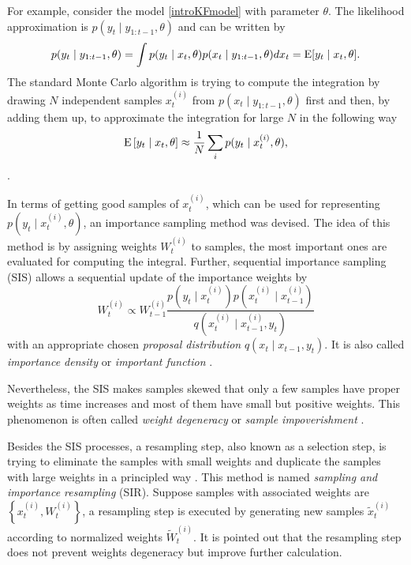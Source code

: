 For example, consider the model \eqref{introKFmodel} with parameter $\theta$. The likelihood approximation is $p(y_t\mid y_{1:t-1},\theta)$ and can be written by
\begin{equation*}
p(y_t\mid y_{1:t-1},\theta) = \int p(y_t\mid x_t,\theta)p(x_t\mid y_{1:t-1},\theta) dx_t = \mathrm{E} \lbrack y_t\mid x_t,\theta \rbrack.
\end{equation*}
The standard Monte Carlo algorithm is trying to compute the integration by drawing $N$ independent samples $x_t^{(i)}$ from $p(x_t\mid y_{1:t-1},\theta)$ first and then, by adding them up, to approximate the integration for large $N$ in the following way 
\begin{equation*}
\mathrm{E}\left[ y_t\mid x_t,\theta \right]\approx \frac{1}{N}\sum_i p(y_t\mid x_t^{(i)},\theta), 
\end{equation*}
\citep{kalos2008monte}.

In terms of getting good samples of $x_t^{(i)}$, which can be used for representing $p(y_t\mid x_t^{(i)},\theta)$, an importance sampling method was devised. The idea of this method is by assigning weights $W_t^{(i)}$ to samples, the most important ones are evaluated for computing the integral. Further, sequential importance sampling (SIS) allows a sequential update of the importance weights by 
\begin{equation*}
W_t^{(i)} \propto W_{t-1}^{(i)} \frac{ p\left(y_t \mid x_t^{(i)}\right) p\left(x_{t}^{(i)}\mid x_{t-1}^{(i)}\right) }{q\left(x_{t}^{(i)}\mid x_{t-1}^{(i)},y_{t}\right)}
\end{equation*}
with an appropriate chosen \textit{proposal distribution} $q(x_{t}\mid  x_{t-1},y_{t})$. It is also called \textit{importance density} or \textit{important function}  \citep{chen2003bayesian}. 


Nevertheless, the SIS makes samples skewed that only a few samples have proper weights as time increases and most of them have small but positive weights. This phenomenon is often called \textit{weight degeneracy} or \textit{sample impoverishment} \citep{green1995reversible, berzuini1997dynamic}. 


Besides the SIS processes, a resampling step, also known as a selection step, is trying to eliminate the samples with small weights and duplicate the samples with large weights in a principled way \citep{rubin2004multiple, tanner1987calculation}. This method is named \textit{sampling and importance resampling} (SIR). Suppose samples with associated weights are $\left\lbrace x_t^{(i)},W_t^{(i)}\right\rbrace$, a resampling step is executed by generating new samples $\tilde{x}_t^{(i)}$ according to normalized weights $\tilde{W}_t^{(i)}$. It is pointed out that the resampling step does not prevent weights degeneracy but improve further calculation. 

